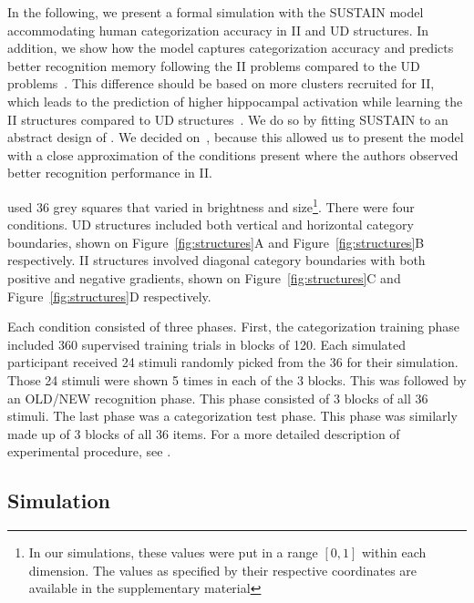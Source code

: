 \documentclass[10pt,letterpaper]{article}
\begin{document}
In the following, we present a formal simulation with the SUSTAIN model
accommodating human categorization accuracy in II and UD structures.
In addition, we show how the model captures categorization accuracy
and predicts better recognition memory following the II problems compared to
the UD problems~\cite{3edmunds2016a}. This difference should be based on
more clusters recruited for II, which leads to the prediction of higher
hippocampal activation while learning the II structures compared to
UD structures~\cite{Carpenter2016}. We do so by fitting SUSTAIN to an abstract design
of . We decided on~, because
this allowed us to present the model with a close approximation of the conditions
present where the authors observed better recognition performance in II.

 used 36 grey squares that varied in brightness and
size\footnote{In our simulations, these values were put in a range $[0, 1]$ within each
dimension. The values as specified by their respective coordinates are available in
the supplementary material}. There were four conditions. UD structures included
both vertical and horizontal category boundaries, shown on Figure~\ref{fig:structures}A
and Figure~\ref{fig:structures}B respectively. II structures involved diagonal category boundaries with
both positive and negative gradients, shown on Figure~\ref{fig:structures}C
and Figure~\ref{fig:structures}D respectively.

Each condition consisted of three phases. First, the categorization training
phase included 360 supervised training trials in blocks of 120. Each
simulated participant received 24 stimuli randomly picked from the 36 for their
simulation. Those 24 stimuli were shown 5 times in each of the 3 blocks.
This was followed by an OLD/NEW recognition phase. This phase
consisted of 3 blocks of all 36 stimuli. The last phase was
a categorization test phase. This phase was similarly made up of 3 blocks of
all 36 items. For a more detailed description of experimental
procedure, see .

\subsection{Simulation}
\end{document}
